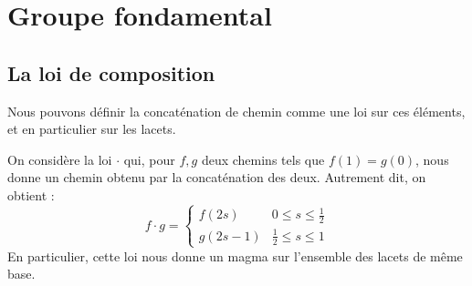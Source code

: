 \documentclass[hidelinks, 10pt]{article}
\begin{document}
\section{Groupe fondamental}

\subsection{La loi de composition}
Nous pouvons définir la concaténation de chemin comme une loi sur ces éléments, et en particulier sur les lacets.
\begin{definition}
On considère la loi $\cdot$ qui, pour $f,g$ deux chemins tels que $f(1)=g(0)$, nous donne un chemin obtenu par la concaténation des deux. Autrement dit, on obtient : \[f\cdot g=\left\{\begin{matrix}
f(2s)&0\leq s\leq \frac{1}{2}\\ 
g(2s-1)&\frac{1}{2}\leq s\leq 1
\end{matrix}\right.\]En particulier, cette loi nous donne un magma sur l'ensemble des lacets de même base.
\end{definition}
\end{document}

